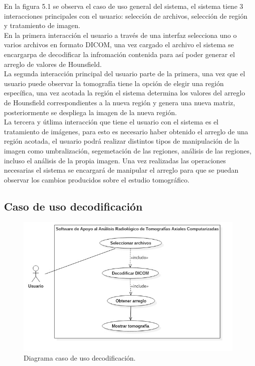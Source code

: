 \documentclass[12pt]{report}
\begin{document}
En la figura 5.1 se observa el caso de uso general del sistema, el sistema tiene 3 interacciones principales con el usuario: selección de archivos, selección de región y tratamiento de imagen.\\ En la primera interacción el usuario a través de una interfaz selecciona uno o varios archivos en formato DICOM, una vez cargado el archivo el sistema se encargarpa de decodificar la infromación contenida para así poder generar el arreglo de valores de Hounsfield.\\ La segunda interacción principal del usuario parte de la primera, una vez que el usuario puede observar la tomografía tiene la opción de elegir una región específica, una vez acotada la región el sistema determina los valores del arreglo de Hounsfield correspondientes a la nueva región y genera una nueva matriz, posteriormente se despliega la imagen de la nueva región.\\ La tercera y útlima interacción que tiene el usuario con el sistema es el tratamiento de imágenes, para esto es necesario haber obtenido el arreglo de una región acotada, el usuario podrá realizar distintos tipos de manipulación de la imagen como umbralización, segemetación de las regiones, análisis de las regiones, incluso el análisis de la propia imagen. Una vez realizadas las operaciones necesarias el sistema se encargará de manipular el arreglo para que se puedan observar los cambios producidos sobre el estudio tomográfico.

\subsection{Caso de uso decodificación}
\begin{figure}[H]
\centering
\includegraphics[width = 10 cm, height =  10 cm]{ArchivoCasos}
\caption{Diagrama caso de uso decodificación.}
\end{figure}
\end{document}
